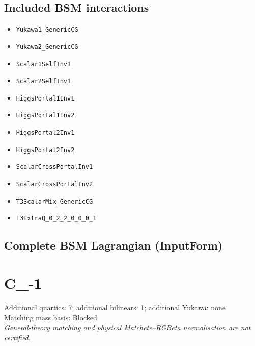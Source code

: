 \documentclass[10pt,a4paper]{article}
\begin{document}
\subsection*{Included BSM interactions}
\begin{itemize}
\item \texttt{Yukawa1\_GenericCG}
\item \texttt{Yukawa2\_GenericCG}
\item \texttt{Scalar1SelfInv1}
\item \texttt{Scalar2SelfInv1}
\item \texttt{HiggsPortal1Inv1}
\item \texttt{HiggsPortal1Inv2}
\item \texttt{HiggsPortal2Inv1}
\item \texttt{HiggsPortal2Inv2}
\item \texttt{ScalarCrossPortalInv1}
\item \texttt{ScalarCrossPortalInv2}
\item \texttt{T3ScalarMix\_GenericCG}
\item \texttt{T3ExtraQ\_0\_2\_2\_0\_0\_0\_1}
\end{itemize}
\subsection*{Complete BSM Lagrangian (InputForm)}

\clearpage
\section{C\_-1}
Additional quartics: 7; additional bilinears: 1; additional Yukawa: none\\
Matching mass basis: Blocked\\
\emph{General-theory matching and physical Matchete--RGBeta normalisation are not certified.}
\end{document}
